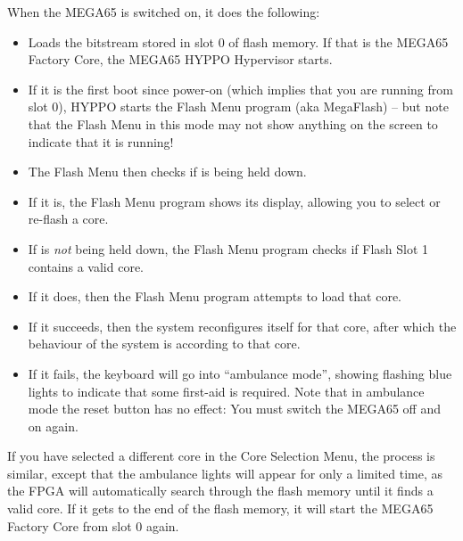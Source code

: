 When the MEGA65 is switched on, it does the following:
\begin{itemize}
\item Loads the bitstream stored in slot 0 of flash memory. If that is the MEGA65 Factory Core, the MEGA65
  HYPPO Hypervisor starts.
\item If it is the first boot since power-on (which implies that you are running from slot 0), HYPPO starts the Flash Menu program (aka MegaFlash) -- but note that the Flash Menu in
      this mode may not show anything on the screen to indicate that it is running!
\item The Flash Menu then checks if  is being held down.
\item If it is, the Flash Menu program shows its display, allowing you to select or re-flash a core.
\item If  is {\em not} being held down, the Flash Menu program checks if Flash Slot 1 contains a valid
      core.
\item If it does, then the Flash Menu program attempts to load that core.
\item If it succeeds, then the system reconfigures itself for that core, after which the behaviour of the system is
      according to that core.
\item If it fails, the keyboard will go into ``ambulance mode'', showing flashing blue lights to indicate that some
      first-aid is required. Note that in ambulance mode the reset button has no effect: You must switch the
      MEGA65 off and on again.
\end{itemize}

If you have selected a different core in the Core Selection Menu, the process is similar, except that the ambulance lights will appear for only a limited time, as the FPGA will automatically search through the flash memory until it finds a valid core. If it gets to the end of the flash memory, it will start the MEGA65 Factory Core from slot 0 again.
